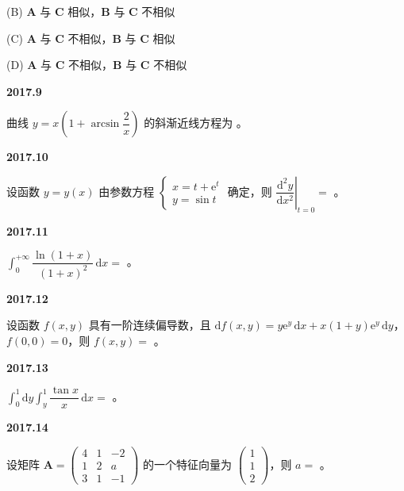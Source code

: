 \documentclass[UTF8,12pt,fontset=windows]{ctexart}
\begin{document}
(B) $\boldsymbol{A}$ 与 $\boldsymbol{C}$ 相似，$\boldsymbol{B}$ 与 $\boldsymbol{C}$ 不相似

(C) $\boldsymbol{A}$ 与 $\boldsymbol{C}$ 不相似，$\boldsymbol{B}$ 与 $\boldsymbol{C}$ 相似

(D) $\boldsymbol{A}$ 与 $\boldsymbol{C}$ 不相似，$\boldsymbol{B}$ 与 $\boldsymbol{C}$ 不相似

\vfill
\newpage
{\large\bfseries 2017.9}

曲线 $y = x\left(1 + \arcsin\dfrac{2}{x}\right)$ 的斜渐近线方程为 \underline{\hspace{20mm}}。

\vfill
\newpage
{\large\bfseries 2017.10}

设函数 $y = y(x)$ 由参数方程 $\begin{cases} x = t + \mathrm{e}^t \\ y = \sin t \end{cases}$ 确定，则 $\left.\dfrac{\mathrm{d}^2 y}{\mathrm{d}x^2}\right|_{t=0} =$ \underline{\hspace{20mm}}。

\vfill
\newpage
{\large\bfseries 2017.11}

$\int_{0}^{+\infty} \dfrac{\ln(1+x)}{(1+x)^2}\,\mathrm{d}x =$ \underline{\hspace{20mm}}。

\vfill
\newpage
{\large\bfseries 2017.12}

设函数 $f(x,y)$ 具有一阶连续偏导数，且 $\mathrm{d}f(x,y) = y\mathrm{e}^y\,\mathrm{d}x + x(1+y)\mathrm{e}^y\,\mathrm{d}y$，$f(0,0) = 0$，则 $f(x,y) =$ \underline{\hspace{20mm}}。

\vfill
\newpage
{\large\bfseries 2017.13}

$\int_{0}^{1}\mathrm{d}y\int_{y}^{1} \dfrac{\tan x}{x}\,\mathrm{d}x =$ \underline{\hspace{20mm}}。

\vfill
\newpage
{\large\bfseries 2017.14}

设矩阵 $\boldsymbol{A} = \begin{pmatrix} 4 & 1 & -2 \\ 1 & 2 & a \\ 3 & 1 & -1 \end{pmatrix}$ 的一个特征向量为 $\begin{pmatrix} 1 \\ 1 \\ 2 \end{pmatrix}$，则 $a =$ \underline{\hspace{20mm}}。
\end{document}
